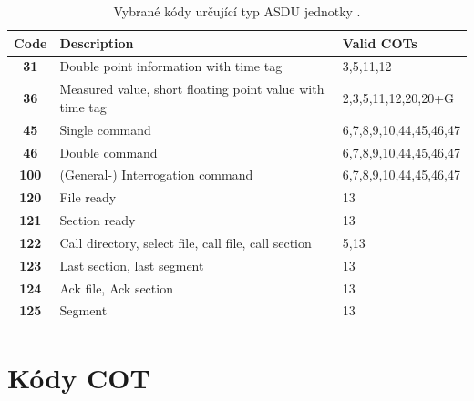 \begin{table}[H]
\centering
    \begin{tabularx}{\textwidth}{|c|X|l|}
        \hline
        \textbf{Code}             & \textbf{Description}                                     & \textbf{Valid COTs} \\ \hline
        \textbf{31}  & Double point information with time tag                   & 3,5,11,12           \\ \hline
        \textbf{36}  & Measured value, short floating point value with time tag & 2,3,5,11,12,20,20+G \\ \hline
        \textbf{45}  & Single command                                           & 6,7,8,9,10,44,45,46,47 \\ \hline
        \textbf{46}  & Double command                                           & 6,7,8,9,10,44,45,46,47 \\ \hline
        \textbf{100}  & (General-) Interrogation command                                            & 6,7,8,9,10,44,45,46,47 \\ \hline
        \textbf{120} & File ready                                               & 13                  \\ \hline
        \textbf{121} & Section ready                                            & 13                  \\ \hline
        \textbf{122} & Call directory, select file, call file, call section     & 5,13                \\ \hline
        \textbf{123} & Last section, last segment                               & 13                  \\ \hline
        \textbf{124} & Ack file, Ack section                                    & 13                  \\ \hline
        \textbf{125} & Segment                                                  & 13                  \\ \hline
    \end{tabularx}
    \caption{Vybrané kódy určující typ ASDU jednotky \cite{iec_104}.}
    \label{asdu_types_table}
\end{table}


\chapter{Kódy COT}
 
